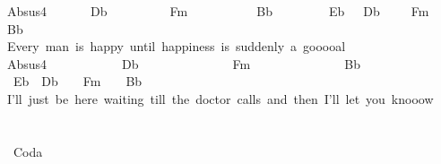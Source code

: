 {Absus4\ \ \ \ \ \ \ Db\ \ \ \ \ \ \ \ \ \ Fm\ \ \ \ \ \ \ \ \ \ \ Bb\ \ \ \ \ \ \ \ \ Eb\ \ \ Db\ \ \ \ \ Fm\ \ \ \ Bb\\
Every\ man\ is\ happy\ until\ happiness\ is\ suddenly\ a\ gooooal\\
Absus4\ \ \ \ \ \ \ \ \ \ \ \ Db\ \ \ \ \ \ \ \ \ \ \ \ \ \ \ Fm\ \ \ \ \ \ \ \ \ \ \ \ \ \ \ Bb\ \ \ \ \ \ \ \ \ \ \ \ \ \ \ \ Eb\ \ Db\ \ \ \ Fm\ \ \ \ Bb\\
I'll\ just\ be\ here\ waiting\ till\ the\ doctor\ calls\ and\ then\ I'll\ let\ you\ knooow\\
\\
\\
\lbrack\ Coda\rbrack\ }

